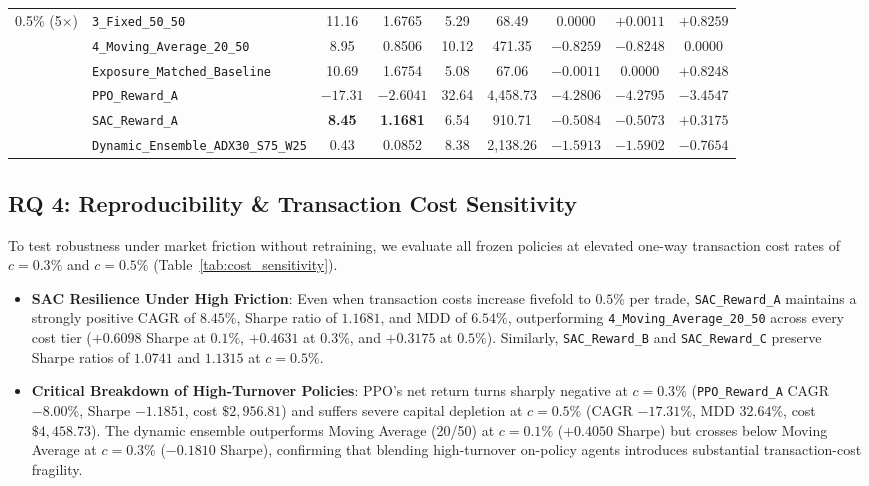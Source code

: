 \documentclass[10pt,twocolumn,conference]{IEEEtran}
\begin{document}
\begin{table}[t]
{\begin{tabular}{clccccccc}
\midrule
\multirow{6}{*}{0.5\% (5$\times$)}
 & \texttt{3\_Fixed\_50\_50}                & 11.16 & 1.6765 &  5.29 &    68.49 &   0.0000 & $+0.0011$ & $+0.8259$ \\
 & \texttt{4\_Moving\_Average\_20\_50}      &  8.95 & 0.8506 & 10.12 &   471.35 & $-0.8259$ & $-0.8248$ &   0.0000 \\
 & \texttt{Exposure\_Matched\_Baseline}     & 10.69 & 1.6754 &  5.08 &    67.06 & $-0.0011$ &   0.0000 & $+0.8248$ \\
 & \texttt{PPO\_Reward\_A}                  & $-17.31$ & $-2.6041$ & 32.64 & 4,458.73 & $-4.2806$ & $-4.2795$ & $-3.4547$ \\
 & \texttt{SAC\_Reward\_A}                  & \textbf{8.45} & \textbf{1.1681} &  6.54 &   910.71 & $-0.5084$ & $-0.5073$ & $\mathbf{+0.3175}$ \\
 & \texttt{Dynamic\_Ensemble\_ADX30\_S75\_W25} &  0.43 & 0.0852 &  8.38 & 2,138.26 & $-1.5913$ & $-1.5902$ & $-0.7654$ \\
\bottomrule
\end{tabular}%
}
\end{table}

\subsection{RQ 4: Reproducibility \& Transaction Cost Sensitivity}
To test robustness under market friction without retraining, we evaluate all frozen policies at elevated one-way transaction cost rates of $c = 0.3\%$ and $c = 0.5\%$ (Table~\ref{tab:cost_sensitivity}).
\begin{itemize}
    \item \textbf{SAC Resilience Under High Friction}: Even when transaction costs increase fivefold to $0.5\%$ per trade, \texttt{SAC\_Reward\_A} maintains a strongly positive CAGR of $8.45\%$, Sharpe ratio of $1.1681$, and MDD of $6.54\%$, outperforming \texttt{4\_Moving\_Average\_20\_50} across every cost tier ($+0.6098$ Sharpe at $0.1\%$, $+0.4631$ at $0.3\%$, and $+0.3175$ at $0.5\%$). Similarly, \texttt{SAC\_Reward\_B} and \texttt{SAC\_Reward\_C} preserve Sharpe ratios of $1.0741$ and $1.1315$ at $c = 0.5\%$.
    \item \textbf{Critical Breakdown of High-Turnover Policies}: PPO's net return turns sharply negative at $c = 0.3\%$ (\texttt{PPO\_Reward\_A} CAGR $-8.00\%$, Sharpe $-1.1851$, cost $\$2,956.81$) and suffers severe capital depletion at $c = 0.5\%$ (CAGR $-17.31\%$, MDD $32.64\%$, cost $\$4,458.73$). The dynamic ensemble outperforms Moving Average (20/50) at $c = 0.1\%$ ($+0.4050$ Sharpe) but crosses below Moving Average at $c = 0.3\%$ ($-0.1810$ Sharpe), confirming that blending high-turnover on-policy agents introduces substantial transaction-cost fragility.
\end{itemize}
\end{document}
